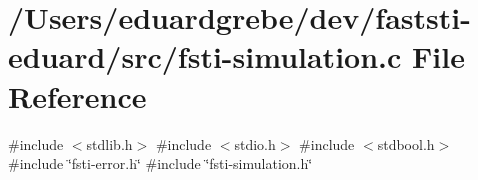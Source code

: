 \hypertarget{fsti-simulation_8c}{}\section{/\+Users/eduardgrebe/dev/faststi-\/eduard/src/fsti-\/simulation.c File Reference}
\label{fsti-simulation_8c}
{\ttfamily \#include $<$stdlib.\+h$>$}\newline
{\ttfamily \#include $<$stdio.\+h$>$}\newline
{\ttfamily \#include $<$stdbool.\+h$>$}\newline
{\ttfamily \#include \char`\"{}fsti-\/error.\+h\char`\"{}}\newline
{\ttfamily \#include \char`\"{}fsti-\/simulation.\+h\char`\"{}}\newline
